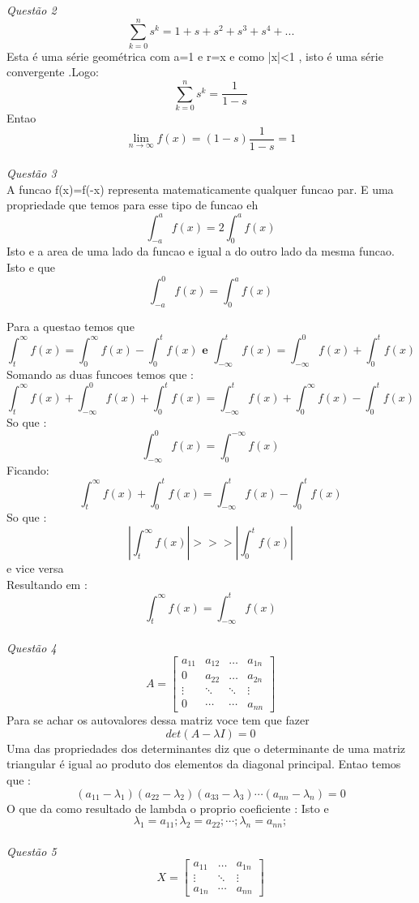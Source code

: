 \documentclass[100pt]{article}
\begin{document}
\emph{Quest\~ao 2}\\
$$\sum_{k=0}^{n} s^{k}=1+s+s^{2}+s^{3}+s^{4}+...$$
Esta é uma série geométrica com a=1 e r=x e como |x|<1 , isto é uma série convergente .Logo:
 $$\sum_{k=0}^{n} s^{k}=\frac{1}{1-s}$$
 Entao 
 $$\lim_{n \to \infty} f(x)=(1-s)\frac{1}{1-s}=1$$\\
 \emph{Quest\~ao 3}\\
 A funcao f(x)=f(-x) representa matematicamente qualquer funcao par.
E uma propriedade que temos para esse tipo de funcao eh 
$$\int_{-a}^{a} f(x)=2\int_0^{a} f(x)$$
Isto e a area de uma lado da funcao e igual a do outro lado da mesma funcao.
Isto e que 
$$\int_{-a}^0 f(x) = \int_0^{a} f(x)$$


Para a questao temos que 
$$\int_t^{\infty} f(x)=\int_0^{\infty}f(x)-\int_0^t f(x) \textbf{ e } \int_{-\infty}^t f(x)=\int_{-\infty}^0 f(x) +\int_0^t f(x) $$
Somando as duas funcoes temos que :
$$\int_t^{\infty} f(x) + \int_{-\infty}^0f(x)+\int_0^t f(x)=\int_{-\infty}^t f(x) + \int_0^{\infty}f(x)-\int_0^t f(x)$$
So que :
$$\int_{-\infty}^0f(x)=\int_0^{-\infty}f(x)$$
Ficando:
$$\int_t^{\infty} f(x) + \int_0^t f(x)=\int_{-\infty}^t f(x) -\int_0^t f(x)$$
So que :
$$\left|\int_t^{\infty} f(x)\right|>>>\left|\int_0^t f(x)\right|$$
e vice versa\\
Resultando em :
$$\int_t^{\infty} f(x) =\int_{-\infty}^t f(x) $$
\\
\emph{Quest\~ao 4}
\\
$$A=\left[\begin{array}{ccrll}
a_{11}& a_{12} & \ldots &a_{1n}\\
0  & a_{22}& \dots & a_{2n}\\
\vdots &\ddots &\ddots &\vdots\\
0 &\cdots &\cdots& a_{nn}
\end{array}\right]$$
Para se achar os autovalores dessa matriz voce tem que fazer 
$$det(A-\lambda I)=0$$
Uma das propriedades dos determinantes diz que o determinante de uma matriz triangular é igual ao
 produto dos elementos da 
diagonal principal. 
Entao temos que :
$$(a_{11}- \lambda_1)(a_{22}- \lambda_2)(a_{33}- \lambda_3)\cdots(a_{nn}- \lambda_n)=0$$
O que da como resultado de lambda o proprio coeficiente :
Isto e
$$ \lambda_1 =a_{11};\lambda_2 =a_{22};\cdots;\lambda_n =a_{nn};$$
\\
\emph{Quest\~ao 5}
\\
$$X=\left[\begin{array}{ccrll}
a_{11} & \ldots &a_{1n}\\
\vdots &\ddots &\vdots\\
a_{1n} &\cdots & a_{nn}
\end{array}\right]$$
\end{document}
